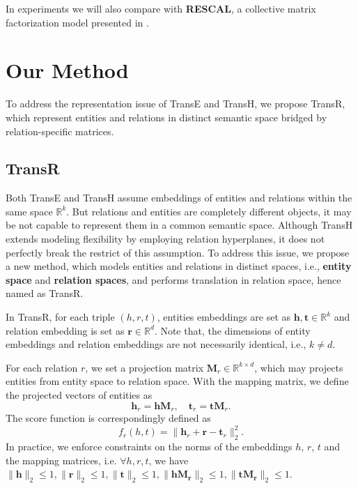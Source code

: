     In experiments we will also compare with \textbf{RESCAL}, a collective matrix factorization model presented in .



    \section{Our Method}
    \label{sec:method}

    To address the representation issue of TransE and TransH, we propose TransR, which represent entities and relations in distinct semantic space bridged by relation-specific matrices.

    \subsection{TransR}
    Both TransE and TransH assume embeddings of entities and relations within the same space $\mathbb{R}^k$. But relations and entities are completely different objects, it may be not capable to represent them in a common semantic space. Although TransH extends modeling flexibility by employing relation hyperplanes, it does not perfectly break the restrict of this assumption. To address this issue, we propose a new method, which models entities and relations in distinct spaces, i.e., \textbf{entity space} and \textbf{relation spaces}, and performs translation in relation space, hence named as TransR.

    In TransR, for each triple $(h, r, t)$, entities embeddings are set as $\mathbf{h}, \mathbf{t} \in \mathbb{R}^k$ and relation embedding is set as $\mathbf{r} \in \mathbb{R}^d$. Note that, the dimensions of entity embeddings and relation embeddings are not necessarily identical, i.e., $k \ne d$.

    For each relation $r$, we set a projection matrix $\mathbf{M}_{r} \in \mathbb{R}^{k \times d}$, which may projects entities from entity space to relation space. With the mapping matrix, we define the projected vectors of entities as
    \begin{equation}
    \mathbf{h}_{r} = \mathbf{h}\mathbf{M}_r, \quad \mathbf{t}_{r} = \mathbf{t}\mathbf{M}_r.
    \end{equation}
    The score function is correspondingly defined as
    \begin{equation}
    f_{r}(h, t) = \|\mathbf{h}_r + \mathbf{r} - \mathbf{t}_r\|_{2}^{2}.
    \end{equation}
    In practice, we enforce constraints on the norms of the embeddings $h$, $r$, $t$ and the mapping matrices, i.e. $\forall h, r, t$, we have $\|\mathbf{h}\|_2\le1,\|\mathbf{r}\|_2\le1, \|\mathbf{t}\|_2\le1, \|\mathbf{h}\mathbf{M_r}\|_2\le1, \|\mathbf{t}\mathbf{M_r}\|_2\le1$.

